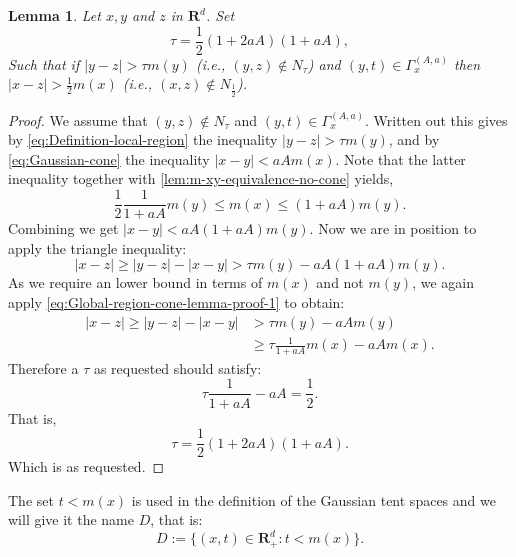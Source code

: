 \documentclass[a4paper,oneside,10pt]{amsproc}
\theoremstyle{plain}
\newtheorem{lemma}{Lemma}
\theoremstyle{remark}
\theoremstyle{definition}
\renewcommand{\leq}{\leqslant}
\renewcommand{\leq}{\leqslant}
\renewcommand{\geq}{\geqslant}
\newcommand{\R}{\mathbf R}
\renewcommand{\leq}{\leqslant} %
\renewcommand{\geq}{\geqslant} %
\begin{document}
\begin{lemma}
  \label{def:Global-region-cone-lemma}
  Let $x, y$ and $z$ in $\R^d$. Set
  \begin{equation*}
    \tau = \frac12 (1 + 2aA)(1 + aA),
  \end{equation*}
  Such that if $|y - z| > \tau m(y)$ (i.e., $(y, z) \notin N_\tau$)
  and $(y, t) \in \Gamma_x^{(A, a)}$ then $|x - z| > \frac12 m(x)$
  (i.e., $(x, z) \notin N_{\frac12}$).
\end{lemma}
\begin{proof}
  We assume that $(y, z) \notin N_\tau$ and $(y, t) \in \Gamma_x^{(A,
    a)}$. Written out this gives by \eqref{eq:Definition-local-region}
  the inequality $|y - z| > \tau m(y)$, and by
  \eqref{eq:Gaussian-cone} the inequality $|x - y| < aA m(x)$. Note
  that the latter inequality together with
  \autoref{lem:m-xy-equivalence-no-cone} yields,
  \begin{equation}
    \label{eq:Global-region-cone-lemma-proof-1}
    \frac12 \frac1{1 + aA} m(y) \leq m(x) \leq (1 + aA) m(y).
  \end{equation}
  Combining we get $|x - y| < aA (1 + aA) m(y)$. Now we are in
  position to apply the triangle inequality:
  \begin{equation*}
    |x - z| \geq |y - z| - |x - y| > \tau m(y) - aA (1 + aA) m(y).
  \end{equation*}
  As we require an lower bound in terms of $m(x)$ and not $m(y)$, we
  again apply \eqref{eq:Global-region-cone-lemma-proof-1} to obtain:
  \begin{align*}
    |x - z| \geq |y - z| - |x - y| &> \tau m(y) - aA m(y)\\
    &\geq \tau \frac1{1 + aA} m(x) - aA m(x).
  \end{align*}
  Therefore a $\tau$ as requested should satisfy:
  \begin{equation*}
    \tau \frac1{1 + aA} - aA = \frac12.
  \end{equation*}
  That is,
  \begin{equation*}
    \tau = \frac12 (1 + 2aA)(1 + aA).
  \end{equation*}
  Which is as requested.
\end{proof}
The set $t < m(x)$ is used in the definition of the Gaussian tent
spaces and we will give it the name $D$, that is:
\begin{equation}
  \label{eq:Definition-cut-off-set-D}
  D := \{(x, t) \in \R^d_+ : t < m(x) \}.
\end{equation}
\end{document}
